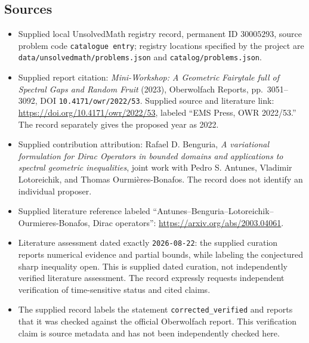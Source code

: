 \documentclass[11pt]{article}
\begin{document}
\subsection{Sources}
\begin{itemize}
\item Supplied local UnsolvedMath registry record, permanent ID \(30005293\), source problem code \texttt{catalogue entry}; registry locations specified by the project are \texttt{data/unsolvedmath/problems.json} and \texttt{catalog/problems.json}.
\item Supplied report citation: \emph{Mini-Workshop: A Geometric Fairytale full of Spectral Gaps and Random Fruit} (2023), Oberwolfach Reports, pp.~3051--3092, DOI \texttt{10.4171/owr/2022/53}. Supplied source and literature link: \url{https://doi.org/10.4171/owr/2022/53}, labeled ``EMS Press, OWR 2022/53.'' The record separately gives the proposed year as 2022.
\item Supplied contribution attribution: Rafael D. Benguria, \emph{A variational formulation for Dirac Operators in bounded domains and applications to spectral geometric inequalities}, joint work with Pedro S. Antunes, Vladimir Lotoreichik, and Thomas Ourmi\`eres-Bonafos. The record does not identify an individual proposer.
\item Supplied literature reference labeled ``Antunes--Benguria--Lotoreichik--Ourmieres-Bonafos, Dirac operators'': \url{https://arxiv.org/abs/2003.04061}.
\item Literature assessment dated exactly \texttt{2026-08-22}: the supplied curation reports numerical evidence and partial bounds, while labeling the conjectured sharp inequality open. This is supplied dated curation, not independently verified literature assessment. The record expressly requests independent verification of time-sensitive status and cited claims.
\item The supplied record labels the statement \texttt{corrected\_verified} and reports that it was checked against the official Oberwolfach report. This verification claim is source metadata and has not been independently checked here.
\end{itemize}
\end{document}
